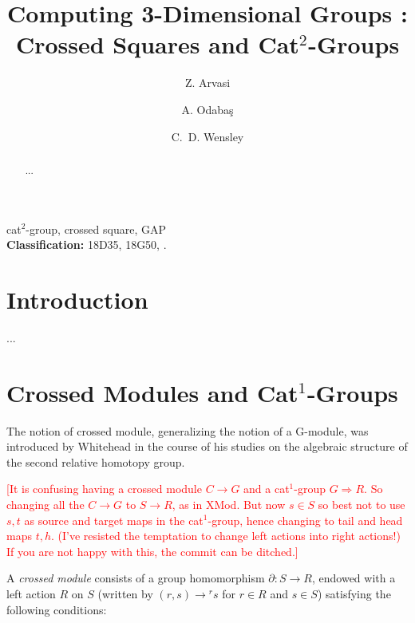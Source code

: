\documentclass[a4paper,11pt]{article}
\theoremstyle{plain}
\theoremstyle{definition}
\begin{document}
\title{Computing 3-Dimensional Groups : Crossed Squares and  Cat$^2$-Groups}

\author[a]{Z. Arvasi}
\author[a]{A. Odaba\c{s}}
\author[b]{C.~D. Wensley}

\date{}

\maketitle

\begin{abstract}
...\end{abstract}

 cat$^2$-group, crossed square, \textsf{GAP}
\\ {\bf Classification:} 18D35, 18G50, .

\section{Introduction}

...

\section{Crossed Modules and Cat$^{1}$-Groups}

The notion of crossed module, generalizing the notion of a G-module, 
was introduced by Whitehead \cite{wayted} in the course of his studies on the
algebraic structure of the second relative homotopy group.


\vspace*{4mm}
\textcolor{red}
{[It is confusing having a crossed module $C \to G$ 
and a cat$^1$-group $G \Rightarrow R$. 
So changing all the $C \to G$ to $S \to R$, as in XMod. 
But now $s \in S$ so best not to use $s,t$ as source and target maps 
in the cat$^1$-group, hence changing to tail and head maps $t,h$. 
(I've resisted the temptation to change left actions into right actions!) 
If you are not happy with this, the commit can be ditched.]
} 
\vspace*{4mm}

A \emph{crossed module} consists of a group homomorphism 
$\partial : S \rightarrow R$, endowed with a left action $R$ on $S$ 
(written by $(r,s) \rightarrow {}^{r}s$ for $r \in R$ and $s \in S$) 
satisfying the following conditions:
\end{document}
